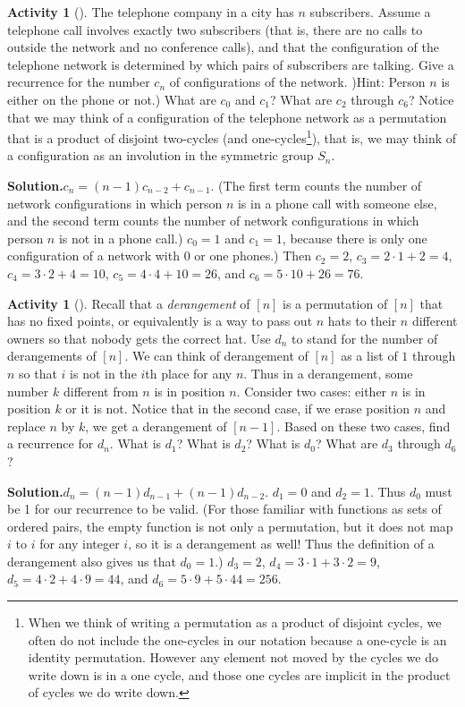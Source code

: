 \documentclass[10pt,]{book}
\theoremstyle{plain}
\theoremstyle{definition}
\newtheorem{activity}[project]{Activity}
\numberwithin{equation}{chapter}
\begin{document}
\begin{activity}[]\label{telephonenetwork}
The telephone company in a city has \(n\) subscribers. Assume a telephone call involves exactly two subscribers (that is, there are no calls to outside the network and no conference calls), and that the configuration of the telephone network is determined by which pairs of subscribers are talking. Give a recurrence for the number \(c_n\) of configurations of the network. )Hint: Person \(n\) is either on the phone or not.) What are \(c_0\) and \(c_1\)? What are \(c_2\) through \(c_6\)? Notice that we may think of a configuration of the telephone network as a permutation that is a product of disjoint two-cycles (and one-cycles\footnote{When we think of writing a permutation as a product of disjoint cycles, we often do not include the one-cycles in our notation because a one-cycle is an identity permutation.  However any element not moved by the cycles we do write down is in a one cycle, and those one cycles are implicit in the product of cycles we do write down.\label{fn-26}}), that is, we may think of a configuration as an involution in the symmetric group \(S_n\).%
\par\medskip\noindent%
\textbf{Solution.}\quad \(c_n =(n-1)c_{n-2} + c_{n-1}\). (The first term counts the number of network configurations in which person \(n\) is in a phone call with someone else, and the second term counts the number of network configurations in which person \(n\) is not in a phone call.) \(c_0 =1\) and \(c_1=1\), because there is only one configuration of a network with 0 or one phones.) Then \(c_2 =2\), \(c_3 =2\cdot1 +2=4\), \(c_4= 3\cdot2+4=10\), \(c_5= 4\cdot4 +10 = 26\), and \(c_6 = 5\cdot 10+26=76\).%
\end{activity}
\begin{activity}[]\label{derangementrecurrence}
Recall that a \emph{derangement} of \([n]\) is a permutation of \([n]\) that has no fixed points, or equivalently is a way to pass out \(n\) hats to their \(n\) different owners so that nobody gets the correct hat. Use \(d_n\) to stand for the number of derangements of \([n]\). We can think of derangement of \([n]\) as a list of \(1\) through \(n\) so that \(i\) is not in the \(i\)th place for any \(n\). Thus in a derangement, some number \(k\) different from \(n\) is in position \(n\). Consider two cases: either \(n\) is in position \(k\) or it is not. Notice that in the second case, if we erase position \(n\) and replace \(n\) by \(k\), we get a derangement of \([n-1]\). Based on these two cases, find a recurrence for \(d_n\). What is \(d_1\)? What is \(d_2\)? What is \(d_0\)? What are \(d_3\) through \(d_6\)?%
\par\medskip\noindent%
\textbf{Solution.}\quad \(d_n = (n-1)d_{n-1} + (n-1)d_{n-2}\). \(d_1 = 0\) and \(d_2 = 1\). Thus \(d_0\) must be 1 for our recurrence to be valid. (For those familiar with functions as sets of ordered pairs, the empty function is not only a permutation, but it does not map \(i\) to \(i\) for any integer \(i\), so it is a derangement as well! Thus the definition of a derangement also gives us that \(d_0=1\).) \(d_3= 2\), \(d_4=3\cdot1+3\cdot 2=9\), \(d_5=4\cdot2+4\cdot 9 = 44\), and \(d_6 = 5\cdot9+5\cdot44 = 256\).%
\end{activity}
\end{document}
